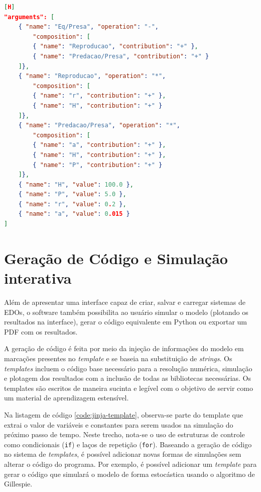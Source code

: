\documentclass[
	12pt,				%
	openright,			%
	oneside,			%
	a4paper,			%
	main=brazil,
	english,			%
	]{ufsj-abntex2}
\begin{document}
\begin{lstlisting}[language=json, label=ri:presa, caption=Trecho da RI que define termos e combinações usadas para definir a equação da presa.][H]
"arguments": [
    { "name": "Eq/Presa", "operation": "-",
        "composition": [
        { "name": "Reproducao", "contribution": "+" },
        { "name": "Predacao/Presa", "contribution": "+" }
    ]},
    { "name": "Reproducao", "operation": "*",
        "composition": [
        { "name": "r", "contribution": "+" },
        { "name": "H", "contribution": "+" }
    ]},
    { "name": "Predacao/Presa", "operation": "*",
        "composition": [
        { "name": "a", "contribution": "+" },
        { "name": "H", "contribution": "+" },
        { "name": "P", "contribution": "+" }
    ]},
    { "name": "H", "value": 100.0 },
    { "name": "P", "value": 5.0 },
    { "name": "r", "value": 0.2 },
    { "name": "a", "value": 0.015 }
]
\end{lstlisting}

\section{Geração de Código e Simulação interativa}

Além de apresentar uma interface capaz de criar, salvar e carregar sistemas de EDOs, o software também possibilita ao usuário simular o modelo (plotando os resultados na interface), gerar o código equivalente em Python ou exportar um PDF com os resultados.

A geração de código é feita por meio da injeção de informações do modelo em marcações presentes no \textit{template} e se baseia na substituição de \textit{strings}. Os \textit{templates} incluem o código base necessário para a resolução numérica, simulação e plotagem dos resultados com a inclusão de todas as bibliotecas necessárias. Os templates são escritos de maneira sucinta e legível com o objetivo de servir como um material de aprendizagem estensível.

Na listagem de código \ref{code:jinja-template}, observa-se parte do template que extrai o valor de variáveis e constantes para serem usados na simulação do próximo passo de tempo. Neste trecho, nota-se o uso de estruturas de controle como condicionais (\texttt{if}) e laços de repetição (\texttt{for}). Baseando a geração de código no sistema de \textit{templates}, é possível adicionar novas formas de simulações sem alterar o código do programa. Por exemplo, é possível adicionar um \textit{template} para gerar o código que simulará o modelo de forma estocástica usando o algoritmo de Gillespie.
\end{document}
